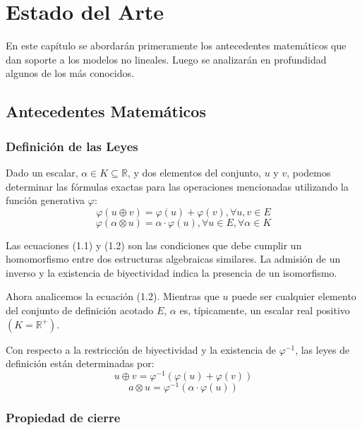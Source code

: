 \chapter{Estado del Arte}\label{chapter:state-of-the-art}

En este cap\'itulo se abordar\'an primeramente los antecedentes matem\'aticos que dan soporte a los modelos no lineales. Luego se analizar\'an en profundidad algunos de los m\'as conocidos.

\section{Antecedentes Matemáticos}

\subsection{Definición de las Leyes}

Dado un escalar, $\alpha \in K \subseteq \mathbb{R}$, y dos elementos del conjunto, $u$ y $v$, podemos determinar las fórmulas exactas para las operaciones mencionadas utilizando la función generativa $\varphi$:
\begin{equation}
	\varphi(u\oplus v) = \varphi(u)+\varphi(v), \forall u,v \in E
\end{equation}
\begin{equation}
	\varphi(\alpha \otimes u) = \alpha \cdot \varphi(u), \forall u \in E, \forall \alpha \in K
\end{equation}

Las ecuaciones (1.1) y (1.2) son las condiciones que debe cumplir un homomorfismo entre dos estructuras algebraicas similares. La admisi\'on de un inverso y la existencia de biyectividad indica la presencia de un isomorfismo.

Ahora analicemos la ecuación (1.2). Mientras que $u$ puede ser cualquier elemento del conjunto de definici\'on acotado $E$, $\alpha$ es, típicamente, un escalar real positivo $(K=\mathbb{R}^+)$.

Con respecto a la restricción de biyectividad y la existencia de $\varphi^{-1}$, las leyes de definición están determinadas por:
\begin{equation}
	u \oplus v = \varphi^{-1}(\varphi(u)+\varphi(v))	
\end{equation}
\begin{equation}	
	a \otimes u = \varphi^{-1}(\alpha\cdot\varphi(u))
\end{equation} 

\subsection{Propiedad de cierre}

